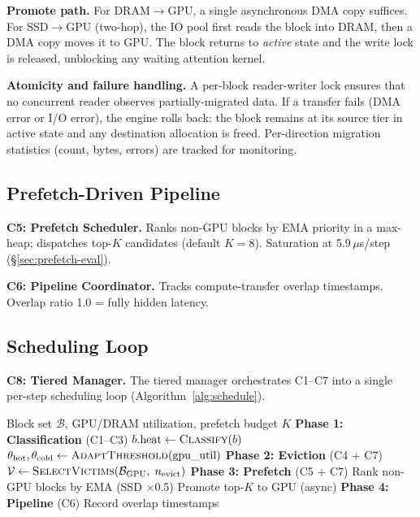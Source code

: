 \documentclass[conference]{IEEEtran}
\begin{document}
\textbf{Promote path.} For DRAM$\to$GPU, a single asynchronous DMA copy suffices. For SSD$\to$GPU (two-hop), the IO pool first reads the block into DRAM, then a DMA copy moves it to GPU. The block returns to \emph{active} state and the write lock is released, unblocking any waiting attention kernel.

\textbf{Atomicity and failure handling.} A per-block reader-writer lock ensures that no concurrent reader observes partially-migrated data. If a transfer fails (DMA error or I/O error), the engine rolls back: the block remains at its source tier in active state and any destination allocation is freed. Per-direction migration statistics (count, bytes, errors) are tracked for monitoring.

\subsection{Prefetch-Driven Pipeline}
\label{sec:pipeline}


\textbf{C5: Prefetch Scheduler.} Ranks non-GPU blocks by EMA priority in a max-heap; dispatches top-$K$ candidates (default $K{=}8$). Saturation at 5.9\,$\mu$s/step (\S\ref{sec:prefetch-eval}).

\textbf{C6: Pipeline Coordinator.} Tracks compute-transfer overlap timestamps. Overlap ratio 1.0 = fully hidden latency.

\subsection{Scheduling Loop}

\textbf{C8: Tiered Manager.} The tiered manager orchestrates C1--C7 into a single per-step scheduling loop (Algorithm~\ref{alg:schedule}).

\begin{algorithm}[t]
\caption{Per-Step Scheduling Loop (C8: Tiered Manager)}
\label{alg:schedule}
\begin{algorithmic}
\Require Block set $\mathcal{B}$, GPU/DRAM utilization, prefetch budget $K$
\Statex
\Statex \textbf{Phase 1: Classification} (C1--C3)
    $b.\text{heat} \gets \Call{Classify}{b}$ 
\EndFor
\State $\theta_{\text{hot}}, \theta_{\text{cold}} \gets \Call{AdaptThreshold}{\text{gpu\_util}}$ 
\Statex
\Statex \textbf{Phase 2: Eviction} (C4 + C7)
    \State $\mathcal{V} \gets \Call{SelectVictims}{\mathcal{B}_{\text{GPU}},\; n_{\text{evict}}}$ 
    \State {} 
\EndIf
{}
    \State {} 
\EndIf
\Statex
\Statex \textbf{Phase 3: Prefetch} (C5 + C7)
\State Rank non-GPU blocks by EMA (SSD $\times$0.5) 
\State Promote top-$K$ to GPU (async) 
\Statex
\Statex \textbf{Phase 4: Pipeline} (C6)
\State Record overlap timestamps
\end{algorithmic}
\end{algorithm}
\end{document}
